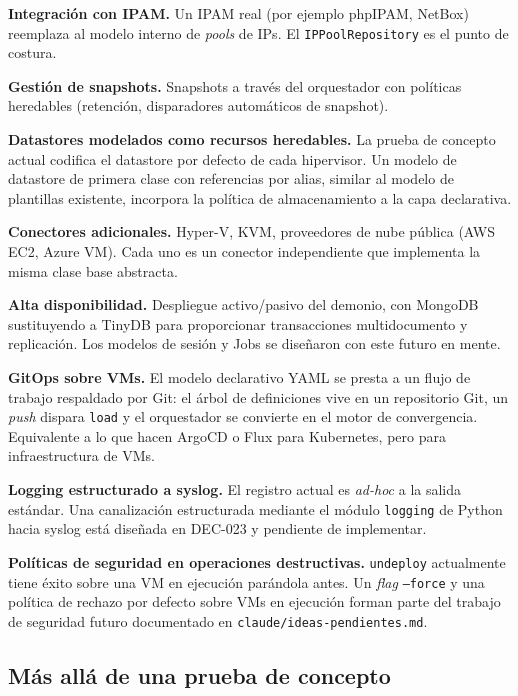 \textbf{Integración con IPAM.} Un IPAM real (por ejemplo phpIPAM,
NetBox) reemplaza al modelo interno de \emph{pools} de IPs. El
\texttt{IPPoolRepository} es el punto de costura.

\textbf{Gestión de snapshots.} Snapshots a través del orquestador
con políticas heredables (retención, disparadores automáticos de
snapshot).

\textbf{Datastores modelados como recursos heredables.} La prueba
de concepto actual codifica el datastore por defecto de cada
hipervisor. Un modelo de datastore de primera clase con
referencias por alias, similar al modelo de plantillas existente,
incorpora la política de almacenamiento a la capa declarativa.

\textbf{Conectores adicionales.} Hyper-V, KVM, proveedores de
nube pública (AWS EC2, Azure VM). Cada uno es un conector
independiente que implementa la misma clase base abstracta.

\textbf{Alta disponibilidad.} Despliegue activo/pasivo del
demonio, con MongoDB sustituyendo a TinyDB para proporcionar
transacciones multidocumento y replicación. Los modelos de sesión
y Jobs se diseñaron con este futuro en mente.

\textbf{GitOps sobre VMs.} El modelo declarativo YAML se presta
a un flujo de trabajo respaldado por Git: el árbol de definiciones
vive en un repositorio Git, un \emph{push} dispara \texttt{load} y
el orquestador se convierte en el motor de convergencia. Equivalente
a lo que hacen ArgoCD o Flux para Kubernetes, pero para
infraestructura de VMs.

\textbf{Logging estructurado a syslog.} El registro actual es
\emph{ad-hoc} a la salida estándar. Una canalización estructurada
mediante el módulo \texttt{logging} de Python hacia syslog está
diseñada en DEC-023 y pendiente de implementar.

\textbf{Políticas de seguridad en operaciones destructivas.}
\texttt{undeploy} actualmente tiene éxito sobre una VM en
ejecución parándola antes. Un \emph{flag} \texttt{--force} y una
política de rechazo por defecto sobre VMs en ejecución forman
parte del trabajo de seguridad futuro documentado en
\texttt{claude/ideas-pendientes.md}.

\subsection{Más allá de una prueba de concepto}

